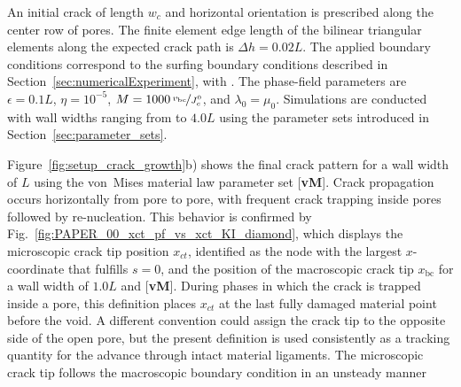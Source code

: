 \documentclass[pdflatex,sn-mathphys-num]{sn-jnl}%
\newcommand{\vMLabel}{[\textbf{vM}]\xspace}
\theoremstyle{thmstyleone}%
\theoremstyle{thmstyletwo}%
\theoremstyle{thmstylethree}%
\begin{document}
An initial crack of length $w_c$ and horizontal orientation is prescribed along the center row of pores. The finite element edge length of the bilinear triangular elements along the expected crack path is $\Delta h = 0.02L$. The applied boundary conditions correspond to the surfing boundary conditions described in Section~\ref{sec:numericalExperiment}, with .  The phase-field parameters are $\epsilon = 0.1L$, $\eta = 10^{-5}$, $M = 1000\,\nicefrac{v_{\text{bc}}}{J_c^0}$, and $\lambda_0 = \mu_0$. Simulations are conducted with wall widths ranging from  to $4.0L$ using the parameter sets introduced in Section~\ref{sec:parameter_sets}.

Figure~\ref{fig:setup_crack_growth}b) shows the final crack pattern for a wall width of $L$ using the von~Mises material law parameter set \vMLabel. Crack propagation occurs horizontally from pore to pore, with frequent crack trapping inside pores followed by re-nucleation. This behavior is confirmed by Fig.~\ref{fig:PAPER_00_xct_pf_vs_xct_KI_diamond}, which displays the microscopic crack tip position $x_{ct}$, identified as the node with the largest $x$-coordinate that fulfills $s=0$, and the position of the macroscopic crack tip $x_{\text{bc}}$ for a wall width of $1.0L$ and \vMLabel. During phases in which the crack is trapped inside a pore, this definition places $x_{ct}$ at the last fully damaged material point before the void. A different convention could assign the crack tip to the opposite side of the open pore, but the present definition is used consistently as a tracking quantity for the advance through intact material ligaments. The microscopic crack tip follows the macroscopic boundary condition in an unsteady manner
\end{document}
